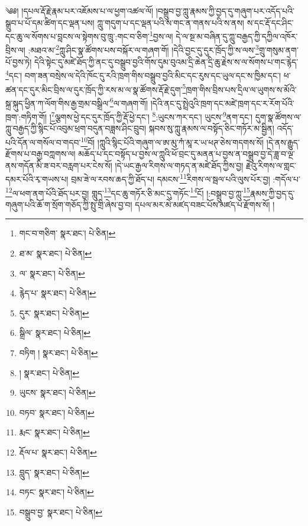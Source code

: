 \setcounter{footnote}{0} 
༄༅། །དཔལ་རྡོ་རྗེ་རྣམ་པར་འཇོམས་པ་ལ་ཕྱག་འཚལ་ལོ། །བསྒྲུབ་བྱ་ཀླུ་རྣམས་ཀྱི་བྱད་དུ་གཞུག་པར་འདོད་པའི་སྒྲུབ་པ་པོ་དམ་ཚིག་དང་ལྡན་པས། ཀླུ་གདུག་པ་དང་ལྡན་པའི་ས་གང་ན་གནས་པའི་ས་ནས། ས་དང་རྡོ་དང་ཤིང་དང་ཆུ་ལ་སོགས་པ་བླངས་ལ་སྟེགས་བུ་ཁྲུ་:གང་བ་ཅིག་\footnote{གང་བ་གཅིག་  སྣར་ཐང་།  པེ་ཅིན། }བྱས་ལ། དེ་ལ་སྔ་མ་བཞིན་དུ་ཀླུ་བརྒྱད་ཀྱི་དཀྱིལ་འཁོར་བྲིས་ལ། :མཐའ་མ་\footnote{ཐ་མ་  སྣར་ཐང་།  པེ་ཅིན། }ཀླུ་ཤིང་སྣ་ཚོགས་པས་བསྐོར་ལ་གཞག་གོ། །དེའི་བྱང་དུ་དུར་ཁྲོད་ཀྱི་ས་ལས་\footnote{ལ་  སྣར་ཐང་།  པེ་ཅིན། }གྲུ་གསུམ་ནག་པོ་བྱས་ཏེ། དེའི་སྟེང་དུ་མཛེ་ཐོད་ཀྱི་ནང་དུ་བསྒྲུབ་བྱའི་གོས་དུམ་བུའམ་དྲི་ཆེན་དྲི་ཆུ་རྗེས་ས་ལ་སོགས་པ་གང་རྙེད་\footnote{རྙེད་པ་  སྣར་ཐང་།  པེ་ཅིན། }དང་། བག་ཟན་བསྲེས་ལ་དེའི་ཁོང་དུ་རའི་ཁྲག་གིས་བསྒྲུབ་བྱའི་མིང་དང་རུས་དང་ཡུལ་དང་ས་ཁྱིམ་དང་། ཕ་ཚན་དང་དུར་མིང་བྲིས་ལ་དུར་ཁྲོད་ཀྱི་རས་མ་ལ་སྣ་ཚོགས་རྡོ་རྗེ་དུག་\footnote{དུར་  སྣར་ཐང་།  པེ་ཅིན། }ཁྲག་གིས་བྲིས་པས་དྲིལ་ལ་ཡུགས་ས་མོའི་སྐྲ་སྐུད་ཕྱིན་ཀ་ལོག་གིས་རྒྱ་གྲམ་བསྒྲིལ་\footnote{སྒྲིལ་  སྣར་ཐང་།  པེ་ཅིན། }ལ་གཞག་གོ། །དེའི་ནང་དུ་སྤྲེའུའི་ཁྲག་དང་མཛེ་ཁྲག་དང་ར་རོག་པོའི་ཁྲག་:གཏིག་གོ། །\footnote{བཏིག །  སྣར་ཐང་།  པེ་ཅིན། }ལྕགས་ཕྱེ་དང་དུར་ཁྲོད་ཀྱི་རྡོ་ཕྱེ་དང་། \footnote{།    སྣར་ཐང་།  པེ་ཅིན། }:ཡུངས་ཀར་དང་། ཡུངས་\footnote{ཡུངས་  སྣར་ཐང་།  པེ་ཅིན། }ནག་དང་། དུག་སྣ་ཚོགས་ལ་ཀླུ་བརྒྱད་ཀྱི་སྙིང་པོ་འབུམ་ཕྲག་བདུན་བཟླས་ཤིང་བྲུབ། སྐབས་སུ་ཀླུ་རྣམས་ལ་བསྟོད་ཅིང་གཏོར་མ་སྦྱིན། འདོད་པའི་དོན་ལ་གསོལ་བ་གདབ་\footnote{བཏབ་  སྣར་ཐང་།  པེ་ཅིན། }བོ། །ཀླུའི་སྙིང་པོའི་གཞུག་ལ་ཨ་མུ་ཀཾ་མཱ་ར་ཡ་ཕཊ་ཅེས་གདགས་སོ། །དེ་ནས་རྒྱུད་རྫོགས་པ་བརྒྱ་བཀླགས་ལ། མཆོད་པ་དང་བསྟོད་པ་བྱས་ལ་ཀླུའི་ཕོ་བྲང་དུ་མནན་པ་བྱས་ན་བསྒྲུབ་བྱ་དེ་ཟླ་བ་ལྔ་ནས་གདོན་མི་ཟ་བར་བརླག་པར་ངེས་སོ། །དེ་ཡང་རྒྱལ་རིགས་ལ་གཏད་ན་མཛེ་ཐོད་ཀྱིས་བྱ། རྗེའུ་རིགས་ལ་གླང་དམར་པོའི་རྭ་གཡས་པ། བྲམ་ཟེ་ལ་རབས་ཆད་ཀྱི་ཐོད་པ། དམངས་\footnote{རྨང་  སྣར་ཐང་།  པེ་ཅིན། }རིགས་ལ་སྦལ་པའི་ལུས་པོར་བྱ། :གདོལ་པ་\footnote{རྡོལ་པ་  སྣར་ཐང་།  པེ་ཅིན། }ལ་ཕག་ནག་པོའི་ཐོད་པར་བྱ། གླུད་\footnote{བླུད་  སྣར་ཐང་།  པེ་ཅིན། }དང་ཆུ་གཏོར་ཅི་མང་དུ་གཏོང་\footnote{བཏང་  སྣར་ཐང་།  པེ་ཅིན། }ངོ། །:བསྒྲུབ་བྱ་ཀླུ་\footnote{བསྒྲུབ་བྱ་  སྣར་ཐང་།  པེ་ཅིན། }རྣམས་ཀྱི་བྱད་དུ་གཞུག་པའི་ཆོ་ག་སྲོག་གཅོད་ཀྱི་སྤུ་གྲི་ཞེས་བྱ་བ། དཔལ་མར་མེ་མཛད་བཟང་པོས་མཛད་པ་རྫོགས་སོ། ། 